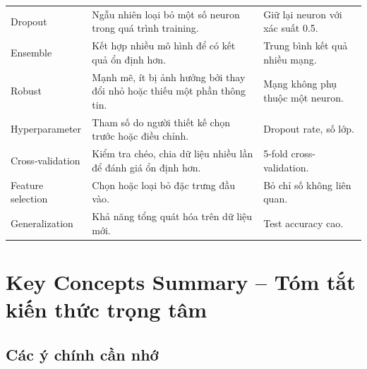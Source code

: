 \begin{longtable}{p{}p{}p{}}
Dropout & Ngẫu nhiên loại bỏ một số neuron trong quá trình training. & Giữ lại neuron với xác suất 0.5. \\

Ensemble & Kết hợp nhiều mô hình để có kết quả ổn định hơn. & Trung bình kết quả nhiều mạng. \\

Robust & Mạnh mẽ, ít bị ảnh hưởng bởi thay đổi nhỏ hoặc thiếu một phần thông tin. & Mạng không phụ thuộc một neuron. \\

Hyperparameter & Tham số do người thiết kế chọn trước hoặc điều chỉnh. & Dropout rate, số lớp. \\

Cross-validation & Kiểm tra chéo, chia dữ liệu nhiều lần để đánh giá ổn định hơn. & 5-fold cross-validation. \\

Feature selection & Chọn hoặc loại bỏ đặc trưng đầu vào. & Bỏ chỉ số không liên quan. \\

Generalization & Khả năng tổng quát hóa trên dữ liệu mới. & Test accuracy cao. \\

\bottomrule
\end{longtable}
\normalsize

\section{Key Concepts Summary -- Tóm tắt kiến thức trọng tâm}

\subsection{Các ý chính cần nhớ}

